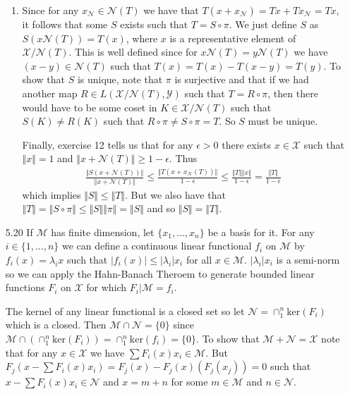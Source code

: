 \documentclass[11pt,letter]{article}
\begin{document}
\begin{enumerate}
\begin{enumerate}
        \item Since for any $x_\mathcal{N} \in \mathcal{N}(T)$ we have that $T(x + x_\mathcal{N}) = Tx + Tx_\mathcal{N} = Tx$, it follows that some $S$ exists such that $T = S \circ \pi$. We just define $S$ as $S(x\mathcal{N}(T)) = T(x)$, where $x$ is a representative element of $\mathcal{X}/\mathcal{N}(T)$. This is well defined since for $x\mathcal{N}(T) = y\mathcal{N}(T)$ we have $(x-y) \in \mathcal{N}(T)$ such that $T(x) = T(x) - T(x-y) = T(y)$. To show that $S$ is unique, note that $\pi$ is surjective and that if we had another map $R \in L(\mathcal{X}/\mathcal{N}(T), \mathcal{Y})$ such that $T = R \circ \pi$, then there would have to be some coset in $K \in \mathcal{X}/\mathcal{N}(T)$ such that $S(K) \ne R(K)$ such that $R \circ \pi \ne S \circ \pi = T$. So $S$ must be unique.
        
        Finally, exercise 12 tells us that for any $\epsilon > 0$ there exists $x \in \mathcal{X}$ such that $\Vert x \Vert = 1$ and $\Vert x + \mathcal{N}(T) \Vert \ge 1 - \epsilon$. Thus
        \begin{align*}
            \frac{\Vert S(x+\mathcal{N}(T)) \Vert}{\Vert x+\mathcal{N}(T) \Vert} \le \frac{\Vert T (x + x_\mathcal{N}(T)) \Vert}{1 - \epsilon} \le \frac {\Vert T \Vert \Vert x \Vert}{1-\epsilon} = \frac {\Vert T \Vert}{1-\epsilon}
        \end{align*}
        which implies $\Vert S \Vert \le \Vert T \Vert$. But we also have that $\Vert T \Vert = \Vert S \circ \pi \Vert \le \Vert S \Vert \Vert \pi \Vert = \Vert S \Vert$ and so $\Vert S \Vert = \Vert T \Vert$.
    \end{enumerate}

    \item [5.20] If $\mathcal{M}$ has finite dimension, let $\{x_1,\dots,x_n\}$ be a basis for it. For any $i \in \{1,\dots,n\}$ we can define a continuous linear functional $f_i$ on $\mathcal{M}$ by $f_i(x) = \lambda_ix$ such that $\vert f_i(x) \vert \le \vert \lambda_i \vert x_i$ for all $x \in \mathcal{M}$. $\vert \lambda_i \vert x_i$ is a semi-norm so we can apply the Hahn-Banach Theroem to generate bounded linear functions $F_i$ on $\mathcal{X}$ for which $F_i \vert \mathcal{M} = f_i$. 
    
    The kernel of any linear functional is a closed set so let $\mathcal{N} = \cap_1^n\text{ker}(F_i)$ which is a closed. Then $\mathcal{M} \cap \mathcal{N} = \{0\}$ since $\mathcal{M} \cap (\cap_1^n \text{ker}(F_i)) = \cap_1^n \text{ker}(f_i) = \{0\}$. To show that $\mathcal{M} + \mathcal{N} = \mathcal{X}$ note that for any $x \in \mathcal{X}$ we have $\sum F_i(x)x_i \in \mathcal{M}$. But $F_j(x - \sum F_i(x)x_i) = F_j(x) - F_j(x)(F_j(x_j)) = 0$ such that $x - \sum F_i(x)x_i \in \mathcal{N}$ and $x = m + n$ for some $m \in \mathcal{M}$ and $n \in \mathcal{N}$.
    

\end{enumerate}
\end{document}
